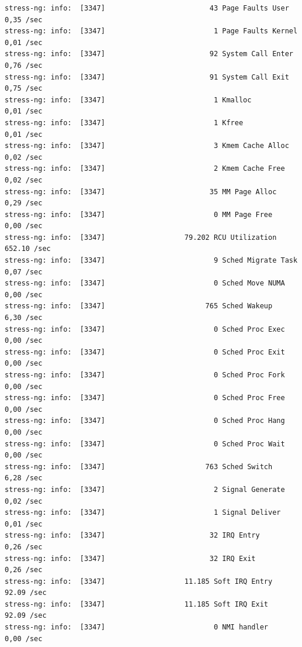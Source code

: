 {\begin{lstlisting}
stress-ng: info:  [3347]                         43 Page Faults User                0,35 /sec 
stress-ng: info:  [3347]                          1 Page Faults Kernel              0,01 /sec 
stress-ng: info:  [3347]                         92 System Call Enter               0,76 /sec 
stress-ng: info:  [3347]                         91 System Call Exit                0,75 /sec 
stress-ng: info:  [3347]                          1 Kmalloc                         0,01 /sec 
stress-ng: info:  [3347]                          1 Kfree                           0,01 /sec 
stress-ng: info:  [3347]                          3 Kmem Cache Alloc                0,02 /sec 
stress-ng: info:  [3347]                          2 Kmem Cache Free                 0,02 /sec 
stress-ng: info:  [3347]                         35 MM Page Alloc                   0,29 /sec 
stress-ng: info:  [3347]                          0 MM Page Free                    0,00 /sec 
stress-ng: info:  [3347]                   79.202 RCU Utilization               652.10 /sec 
stress-ng: info:  [3347]                          9 Sched Migrate Task              0,07 /sec 
stress-ng: info:  [3347]                          0 Sched Move NUMA                 0,00 /sec 
stress-ng: info:  [3347]                        765 Sched Wakeup                    6,30 /sec 
stress-ng: info:  [3347]                          0 Sched Proc Exec                 0,00 /sec 
stress-ng: info:  [3347]                          0 Sched Proc Exit                 0,00 /sec 
stress-ng: info:  [3347]                          0 Sched Proc Fork                 0,00 /sec 
stress-ng: info:  [3347]                          0 Sched Proc Free                 0,00 /sec 
stress-ng: info:  [3347]                          0 Sched Proc Hang                 0,00 /sec 
stress-ng: info:  [3347]                          0 Sched Proc Wait                 0,00 /sec 
stress-ng: info:  [3347]                        763 Sched Switch                    6,28 /sec 
stress-ng: info:  [3347]                          2 Signal Generate                 0,02 /sec 
stress-ng: info:  [3347]                          1 Signal Deliver                  0,01 /sec 
stress-ng: info:  [3347]                         32 IRQ Entry                       0,26 /sec 
stress-ng: info:  [3347]                         32 IRQ Exit                        0,26 /sec 
stress-ng: info:  [3347]                   11.185 Soft IRQ Entry                 92.09 /sec 
stress-ng: info:  [3347]                   11.185 Soft IRQ Exit                  92.09 /sec 
stress-ng: info:  [3347]                          0 NMI handler                     0,00 /sec 

\end{lstlisting}}
